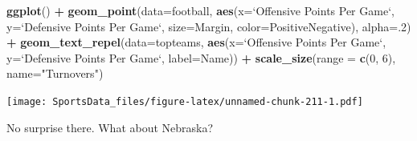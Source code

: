 \documentclass[]{book}
\newenvironment{Shaded}{\begin{snugshade}}{\end{snugshade}}
\newcommand{\DataTypeTok}[1]{\textcolor[rgb]{0.13,0.29,0.53}{#1}}
\newcommand{\DecValTok}[1]{\textcolor[rgb]{0.00,0.00,0.81}{#1}}
\newcommand{\KeywordTok}[1]{\textcolor[rgb]{0.13,0.29,0.53}{\textbf{#1}}}
\newcommand{\NormalTok}[1]{#1}
\newcommand{\OperatorTok}[1]{\textcolor[rgb]{0.81,0.36,0.00}{\textbf{#1}}}
\newcommand{\StringTok}[1]{\textcolor[rgb]{0.31,0.60,0.02}{#1}}
\begin{document}
\begin{Shaded}
\begin{Highlighting}[]
\KeywordTok{ggplot}\NormalTok{() }\OperatorTok{+}
\StringTok{  }\KeywordTok{geom_point}\NormalTok{(}\DataTypeTok{data=}\NormalTok{football, }\KeywordTok{aes}\NormalTok{(}\DataTypeTok{x=}\StringTok{`}\DataTypeTok{Offensive Points Per Game}\StringTok{`}\NormalTok{, }\DataTypeTok{y=}\StringTok{`}\DataTypeTok{Defensive Points Per Game}\StringTok{`}\NormalTok{, }\DataTypeTok{size=}\NormalTok{Margin, }\DataTypeTok{color=}\NormalTok{PositiveNegative), }\DataTypeTok{alpha=}\NormalTok{.}\DecValTok{2}\NormalTok{) }\OperatorTok{+}
\StringTok{  }\KeywordTok{geom_text_repel}\NormalTok{(}\DataTypeTok{data=}\NormalTok{topteams, }\KeywordTok{aes}\NormalTok{(}\DataTypeTok{x=}\StringTok{`}\DataTypeTok{Offensive Points Per Game}\StringTok{`}\NormalTok{, }\DataTypeTok{y=}\StringTok{`}\DataTypeTok{Defensive Points Per Game}\StringTok{`}\NormalTok{, }\DataTypeTok{label=}\NormalTok{Name)) }\OperatorTok{+}\StringTok{ }
\StringTok{  }\KeywordTok{scale_size}\NormalTok{(}\DataTypeTok{range =} \KeywordTok{c}\NormalTok{(}\DecValTok{0}\NormalTok{, }\DecValTok{6}\NormalTok{), }\DataTypeTok{name=}\StringTok{"Turnovers"}\NormalTok{)}
\end{Highlighting}
\end{Shaded}

\texttt{[image: SportsData\_files/figure-latex/unnamed-chunk-211-1.pdf]}

No surprise there. What about Nebraska?

\begin{Shaded}
\end{Shaded}
\end{document}
